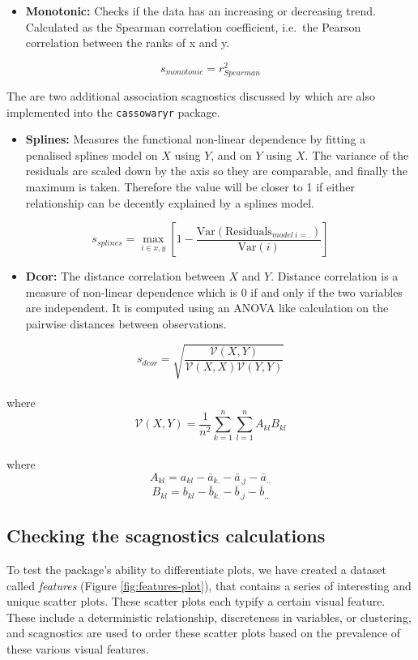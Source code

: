 \begin{itemize}
\tightlist
\item
  \textbf{Monotonic:} Checks if the data has an increasing or decreasing trend. Calculated as the Spearman correlation coefficient, i.e.~the Pearson correlation between the ranks of x and y.
\end{itemize}

\[s_{monotonic} = r^2_{Spearman}\]

The are two additional association scagnostics discussed by \citet{Grimm} which are also implemented into the \texttt{cassowaryr} package.

\begin{itemize}
\tightlist
\item
  \textbf{Splines:} Measures the functional non-linear dependence by fitting a penalised splines model on \(X\) using \(Y\), and on \(Y\) using \(X\). The variance of the residuals are scaled down by the axis so they are comparable, and finally the maximum is taken. Therefore the value will be closer to 1 if either relationship can be decently explained by a splines model.
\end{itemize}

\[s_{splines}=\max_{i\in x,y}\left[ 1-\frac{\mbox{Var}(\mbox{Residuals}_{model~i=.})}{\mbox{Var}(i)}\right] \]

\begin{itemize}
\tightlist
\item
  \textbf{Dcor:} The distance correlation \citep{dcor} between \(X\) and \(Y\). Distance correlation is a measure of non-linear dependence which is 0 if and only if the two variables are independent. It is computed using an ANOVA like calculation on the pairwise distances between observations.
\end{itemize}

\[s_{dcor}= \sqrt{\frac{\mathcal{V}(X,Y)}{\mathcal{V}(X,X)\mathcal{V}(Y,Y)}}\]\\
where
\[\mathcal{V}
(X,Y)=\frac{1}{n^2}\sum_{k=1}^n\sum_{l=1}^nA_{kl}B_{kl}\]\\
where
\[A_{kl}=a_{kl}-\bar{a}_{k.}-\bar{a}_{.j}-\bar{a}_{..}\]
\[B_{kl}=b_{kl}-\bar{b}_{k.}-\bar{b}_{.j}-\bar{b}_{..}\]

\subsection{Checking the scagnostics calculations}\label{checking-the-scagnostics-calculations}

To test the package's ability to differentiate plots, we have created a dataset called \emph{features} (Figure \ref{fig:features-plot}), that contains a series of interesting and unique scatter plots. These scatter plots each typify a certain visual feature. These include a deterministic relationship, discreteness in variables, or clustering, and scagnostics are used to order these scatter plots based on the prevalence of these various visual features.

